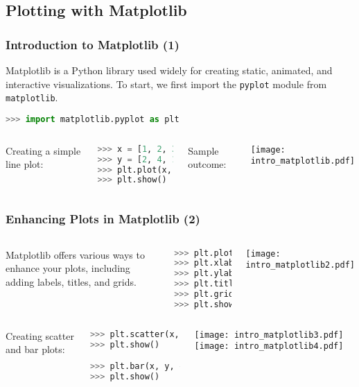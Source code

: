 \subsection*{Plotting with Matplotlib}
\begin{frame}[fragile]
  \frametitle{Introduction to Matplotlib (1)}
  Matplotlib is a Python library used widely for creating static, animated, and interactive visualizations. To start, we first import the \lstinline{pyplot} module from \lstinline{matplotlib}.\pause
  
  \begin{lstlisting}[language=Python, numbers=none]
>>> import matplotlib.pyplot as plt
  \end{lstlisting}\pause
  
  \begin{columns}[T]
    Creating a simple line plot:

    \begin{lstlisting}[language=Python, numbers=none]
>>> x = [1, 2, 3, 4, 5]
>>> y = [2, 4, 1, 3, 7]
>>> plt.plot(x, y)
>>> plt.show()
  \end{lstlisting}
  Sample outcome:
  
  \texttt{[image: intro\_matplotlib.pdf]}
\end{columns}
\end{frame}

\begin{frame}[fragile]
  \frametitle{Enhancing Plots in Matplotlib (2)}

  \begin{columns}
  Matplotlib offers various ways to enhance your plots, including adding labels, titles, and grids.\pause
  \begin{lstlisting}[language=Python, numbers=none, basicstyle=\scriptsize]
>>> plt.plot(x, y)
>>> plt.xlabel('X-axis label')
>>> plt.ylabel('Y-axis label')
>>> plt.title('Plot Title')
>>> plt.grid(True)
>>> plt.show()
  \end{lstlisting}\pause
   \texttt{[image: intro\_matplotlib2.pdf]}
  \end{columns}

  \begin{columns}
  Creating scatter and bar plots:
  \begin{lstlisting}[language=Python, numbers=none, basicstyle=\scriptsize]
>>> plt.scatter(x, y, color='red')
>>> plt.show()

>>> plt.bar(x, y, color='green')
>>> plt.show()
  \end{lstlisting}
  \texttt{[image: intro\_matplotlib3.pdf]}
  \texttt{[image: intro\_matplotlib4.pdf]}
  \end{columns}
\end{frame}


